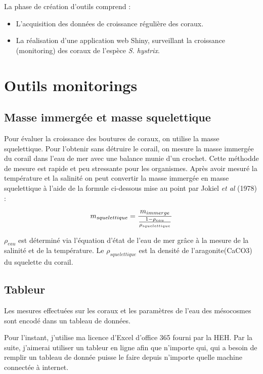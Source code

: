 \documentclass[]{report}
\begin{document}
La phase de création d'outils comprend :

\begin{itemize}
\item
  L'acquisition des données de croissance régulière des coraux.
\item
  La réalisation d'une application web Shiny, surveillant la croissance
  (monitoring) des coraux de l'espèce \emph{S. hystrix}.
\end{itemize}

\section{Outils monitorings}\label{outils-monitorings}

\subsection{Masse immergée et masse
squelettique}\label{masse-immergee-et-masse-squelettique}

Pour évaluer la croissance des boutures de coraux, on utilise la masse
squelettique. Pour l'obtenir sans détruire le corail, on mesure la masse
immergée du corail dans l'eau de mer avec une balance munie d'un
crochet. Cette méthodde de mesure est rapide et peu stressante pour les
organismes. Après avoir mesuré la température et la salinité on peut
convertir la masse immergée en masse squelettique à l'aide de la formule
ci-dessous mise au point par Jokiel \emph{et al} (1978) :

\begin{equation}
\large
  m_{squelettique} = \frac {m_{immerge}}{ \frac{1 - \rho_{eau}}{ \rho_{squelettique}}}
\end{equation}

\(\rho_{eau}\) est déterminé via l'équation d'état de l'eau de mer grâce
à la mesure de la salinité et de la température. Le
\(\rho_{squelettique}\) est la densité de l'aragonite(CaCO3) du
squelette du corail.

\subsection{Tableur}\label{tableur}

Les mesures effectuées sur les coraux et les paramètres de l'eau des
mésocosmes sont encodé dans un tableau de données.

Pour l'instant, j'utilise ma licence d'Excel d'office 365 fourni par la
HEH. Par la suite, j'aimerai utiliser un tableur en ligne afin que
n'importe qui, qui a besoin de remplir un tableau de donnée puisse le
faire depuis n'importe quelle machine connectée à internet.
\end{document}
